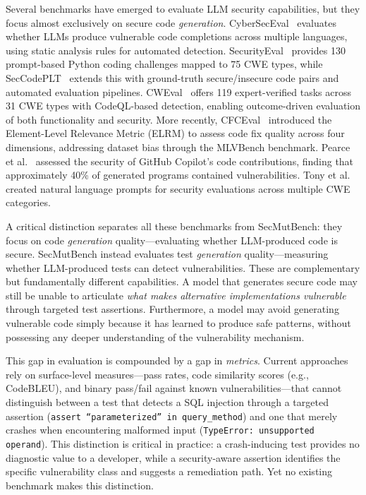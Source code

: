 \documentclass[sigconf,review,anonymous]{acmart}
\begin{document}
Several benchmarks have emerged to evaluate LLM security capabilities, but they focus almost exclusively on secure code \emph{generation}. CyberSecEval~\cite{bhatt2023cyberseceval} evaluates whether LLMs produce vulnerable code completions across multiple languages, using static analysis rules for automated detection. SecurityEval~\cite{siddiq2022securityeval} provides 130 prompt-based Python coding challenges mapped to 75 CWE types, while SecCodePLT~\cite{secccodeplt2024} extends this with ground-truth secure/insecure code pairs and automated evaluation pipelines. CWEval~\cite{yang2024cweval} offers 119 expert-verified tasks across 31 CWE types with CodeQL-based detection, enabling outcome-driven evaluation of both functionality and security. More recently, CFCEval~\cite{cheng2025cfceval} introduced the Element-Level Relevance Metric (ELRM) to assess code fix quality across four dimensions, addressing dataset bias through the MLVBench benchmark. Pearce et al.~\cite{pearce2022asleep} assessed the security of GitHub Copilot's code contributions, finding that approximately 40\% of generated programs contained vulnerabilities. Tony et al.~\cite{tony2023llmseceval} created natural language prompts for security evaluations across multiple CWE categories.

A critical distinction separates all these benchmarks from SecMutBench: they focus on code \emph{generation} quality---evaluating whether LLM-produced code is secure. SecMutBench instead evaluates test \emph{generation} quality---measuring whether LLM-produced tests can detect vulnerabilities. These are complementary but fundamentally different capabilities. A model that generates secure code may still be unable to articulate \emph{what makes alternative implementations vulnerable} through targeted test assertions. Furthermore, a model may avoid generating vulnerable code simply because it has learned to produce safe patterns, without possessing any deeper understanding of the vulnerability mechanism.

This gap in evaluation is compounded by a gap in \emph{metrics}. Current approaches rely on surface-level measures---pass rates, code similarity scores (e.g., CodeBLEU), and binary pass/fail against known vulnerabilities---that cannot distinguish between a test that detects a SQL injection through a targeted assertion (\texttt{assert ``parameterized'' in query\_method}) and one that merely crashes when encountering malformed input (\texttt{TypeError: unsupported operand}). This distinction is critical in practice: a crash-inducing test provides no diagnostic value to a developer, while a security-aware assertion identifies the specific vulnerability class and suggests a remediation path. Yet no existing benchmark makes this distinction.
\end{document}
